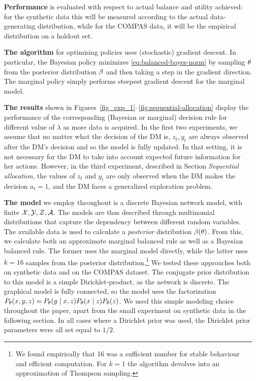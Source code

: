 \textbf{Performance} is evaluated with respect to actual balance and
utility achieved: for the synthetic data this will be measured
according to the actual data-generating distribution, while for the
COMPAS data, it will be the empirical distribution on a holdout set.

\textbf{The algorithm} for optimising policies uses (stochastic) gradient descent. In particular, the Bayesian policy minimizes \eqref{eq:balanced-bayes-norm} by sampling $\theta$ from the posterior distribution $\beta$ and then taking a step in the gradient direction. The marginal policy simply performs steepest gradient descent for the marginal model.

\textbf{The results} shown in
Figures~\ref{fig_exp_1}--\ref{fig:sequential-allocation} display the
performance of the corresponding (Bayesian or marginal) decision rule
for different value of $\lambda$ as more data is acquired. In the
first two experiments, we assume that no matter what the decision of
the DM is, $z_t, y_t$ are always observed after the DM's decision and
so the model is fully updated. In that setting, it is not necessary
for the DM to take into account expected future information for her
actions. However, in the third experiment, described in
Section {\em Sequential allocation}, %
the values of $z_t$ and $y_t$
are only observed when the DM makes the decision $a_t = 1$, and the DM
faces a generalized exploration problem.



\textbf{The model} we employ throughout is a discrete Bayesian network
model, with finite $\mathcal{X}, \mathcal{Y}, \mathcal{Z}, \mathcal{A}$. The models are thus described
through multinomial distributions that capture the dependency between
different random variables. The available data is used to calculate a
\emph{posterior} distribution $\beta(\theta)$. From this, we calculate
both an approximate marginal balanced rule as well as a Bayesian
balanced rule. The former uses the marginal model directly, while the
latter uses $k = 16$ samples from the posterior
distribution.\footnote{We found empirically that 16 was a sufficient
  number for stable behaviour and efficient computation. For $k=1$ the
  algorithm devolves into an approximation of Thompson sampling.} We
tested these approaches both on synthetic data and on the COMPAS
dataset.
%
The conjugate prior distribution to this model is a simple Dirichlet-product, as the network is discrete. The graphical model is fully connected, so the model uses the factorization $P_\theta(x, y, z) = P_\theta(y \mid x, z) P_\theta(x \mid z) P_\theta(z)$. We used this simple modeling choice throughout the paper, apart from the small experiment on synthetic data in the following section. In all cases where a Dirichlet prior was used, the Dirichlet prior parameters were all set equal to $1/2$.




